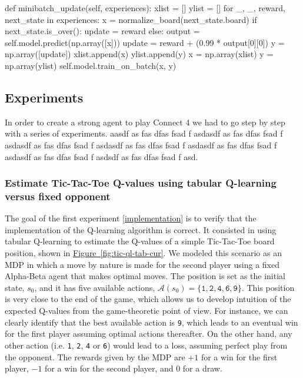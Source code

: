 \documentclass{article}
\newcommand{\GithubURL}[1]{[\href{https://github.com/davidrobles/mlnd-capstone-code/blob/master/#1}{implementation}]}
\begin{document}
\begin{python}

    def minibatch_update(self, experiences):
        xlist = []
        ylist = []
        for _, _, reward, next_state in experiences:
            x = normalize_board(next_state.board)
            if next_state.is_over():
                update = reward
            else:
                output = self.model.predict(np.array([x]))
                update = reward + (0.99 * output[0][0])
            y = np.array([update])
            xlist.append(x)
            ylist.append(y)
        x = np.array(xlist)
        y = np.array(ylist)
        self.model.train_on_batch(x, y)
\end{python}

\pagebreak[4]

\subsection{Experiments}

In order to create a strong agent to play Connect 4 we had to go step by step with a series of
experiments. aasdf as fas dfas fsad f asdasdf as fas dfas fsad f asdasdf as fas dfas fsad f asdasdf
as fas dfas fsad f asdasdf as fas dfas fsad f asdasdf as fas dfas fsad f asdsdf as fas dfas fsad f
asd.

\subsubsection{Estimate Tic-Tac-Toe Q-values using tabular Q-learning versus fixed opponent}
\label{sec:tic-ql-tab-simple-fixed}


The goal of the first experiment \GithubURL{experiments/tic_ql_tab_simple.py} is to verify that the
implementation of the Q-learning algorithm is correct. It consisted in using tabular Q-learning to
estimate the Q-values of a simple Tic-Tac-Toe board position, shown in \hyperref[fig:tic-ql-tab-cur]
{Figure~\ref*{fig:tic-ql-tab-cur}}. We modeled this scenario as an MDP in which a move by nature is
made for the second player using a fixed Alpha-Beta agent that makes optimal moves. The position is
set as the initial state, $s_0$, and it has five available actions, $\mathcal{A}(s_0) =
\{\texttt{1}, \texttt{2}, \texttt{4}, \texttt{6}, \texttt{9}\}$. This position is very close to the
end of the game, which allows us to develop intuition of the expected Q-values from the
game-theoretic point of view. For instance, we can clearly identify that the best available action
is \texttt{9}, which leads to an eventual win for the first player assuming optimal actions
thereafter. On the other hand, any other action (i.e.  \texttt{1}, \texttt{2}, \texttt{4} or
\texttt{6}) would lead to a loss, assuming perfect play from the opponent.  The rewards given by the
MDP are $+1$ for a win for the first player, $-1$ for a win for the second player, and $0$ for a
draw.
\end{document}
